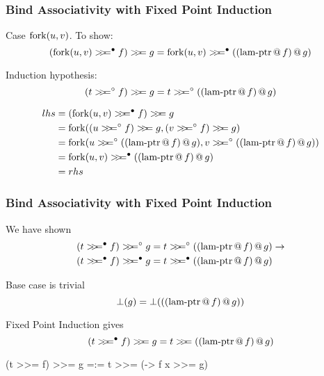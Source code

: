 \documentclass[serif,professionalfont]{beamer}
\begin{document}
\begin{frame}[fragile]
\frametitle{Bind Associativity with Fixed Point Induction}

Case $\mathrm{fork}(u,v)$. To show:
$$\bind{(\bindb{\fork{u}{v}}{f})}{g} = \bindb{\fork{u}{v}}{\lamptr{f}{g}}$$

Induction hypothesis:
$$\bind{(\bindw{t}{f})}{g} = \bindw{t}{\lamptr{f}{g}}$$


\begin{align*}
lhs = & \; \bind{(\bindb{\fork{u}{v}}{f})}{g} \\
    = & \; \fork{\bind{(\bindw{u}{f})}{g}}{\bind{(\bindw{v}{f})}{g}}\\
    = & \; \fork{\bindw{u}{\lamptr{f}{g}}}{\bindw{v}{\lamptr{f}{g}}} \\
    = & \; \bindb{\fork{u}{v}}{\lamptr{f}{g}} \\
    = & \; rhs
\end{align*}

\end{frame}

%
%
%

\begin{frame}[fragile]
\frametitle{Bind Associativity with Fixed Point Induction}

We have shown
\begin{align*}
&\bindw{(\bindb{t}{f})}{g} = \bindw{t}{\lamptr{f}{g}} \rightarrow \\
&\bindb{(\bindb{t}{f})}{g} = \bindb{t}{\lamptr{f}{g}}
\end{align*}

Base case is trivial
$$\bot(g) = \bot(((\mathrm{\operatorname{lam-ptr}} \, @ \, f) \, @ \, g))$$

Fixed Point Induction gives
$$\bind{(\bindb{t}{f})}{g} = \bind{t}{\lamptr{f}{g}}$$

\begin{code}
(t >>= f) >>= g =:= t >>= (\x -> f x >>= g)
\end{code}

\end{frame}
\end{document}

